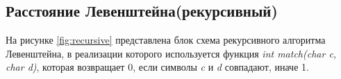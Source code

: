 \begin{figure}[ht!]
\end{figure}

\subsection{ Расстояние Левенштейна(рекурсивный)}
На рисунке \ref{fig:recursive} представлена блок схема рекурсивного алгоритма Левенштейна, в реализации которого используется функция \textit{int match(char c, char d)}, которая возвращает 0, если символы \textit{c} и \textit{d} совпадают, иначе 1. 

\begin{figure}[ht!]
\end{figure}

 
